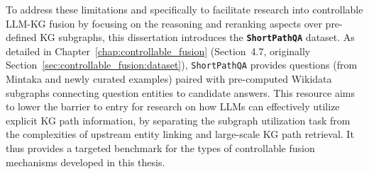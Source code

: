 To address these limitations and specifically to facilitate research into controllable LLM-KG fusion by focusing on the reasoning and reranking aspects over pre-defined KG subgraphs, this dissertation introduces the \textbf{\texttt{ShortPathQA}} dataset. As detailed in Chapter~\ref{chap:controllable_fusion} (Section~4.7, originally Section~\ref{sec:controllable_fusion:dataset}), \texttt{ShortPathQA} provides questions (from Mintaka and newly curated examples) paired with pre-computed Wikidata subgraphs connecting question entities to candidate answers. This resource aims to lower the barrier to entry for research on how LLMs can effectively utilize explicit KG path information, by separating the subgraph utilization task from the complexities of upstream entity linking and large-scale KG path retrieval. It thus provides a targeted benchmark for the types of controllable fusion mechanisms developed in this thesis.